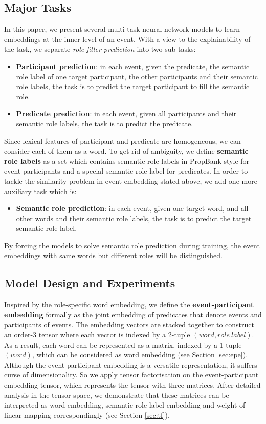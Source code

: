 \documentclass[a4paper]{article}
\begin{document}
\subsection{Major Tasks}
In this paper, we present several multi-task neural network models to learn embeddings at the inner level of an event. With a view to the explainability of the task, we separate \textit{role-filler prediction} into two sub-tasks: 
\begin{itemize}
  \item  \textbf{Participant prediction}: in each event, given the predicate, the semantic role label of one target participant, the other participants and their semantic role labels, the task is to predict the target participant to fill the semantic role. 
  \item  \textbf{Predicate prediction}: in each event, given all participants and their semantic role labels, the task is to predict the predicate. 
\end{itemize}
Since lexical features of participant and predicate are homogeneous, we can consider each of them as a word. To get rid of ambiguity, we define \textbf{semantic role labels} as a set which contains semantic role labels in PropBank style for event participants and a special semantic role label for predicates. In order to tackle the similarity problem in event embedding stated above, we add one more auxiliary task which is: 
\begin{itemize}
  \item  \textbf{Semantic role prediction}: in each event, given one target word, and all other words and their semantic role labels, the task is to predict the target semantic role label. 
\end{itemize}
By forcing the models to solve semantic role prediction during training, the event embeddings with same words but different roles will be distinguished. 

\subsection{Model Design and Experiments}
Inspired by the role-specific word embedding, we define the \textbf{event-participant embedding} formally as the joint embedding of predicates that denote events and participants of events. The embedding vectors are stacked together to construct an order-3 tensor where each vector is indexed by a 2-tuple $(word, role\ label)$. As a result, each word can be represented as a matrix, indexed by a 1-tuple $(word)$, which can be considered as word embedding (see Section \ref{sec:epe}). Although the event-participant embedding is a versatile representation, it suffers curse of dimensionality. So we apply tensor factorisation on the event-participant embedding tensor, which represents the tensor with three matrices. After detailed analysis in the tensor space, we demonstrate that these matrices can be interpreted as word embedding, semantic role label embedding and weight of linear mapping correspondingly (see Section \ref{sec:tf}). 
\end{document}
